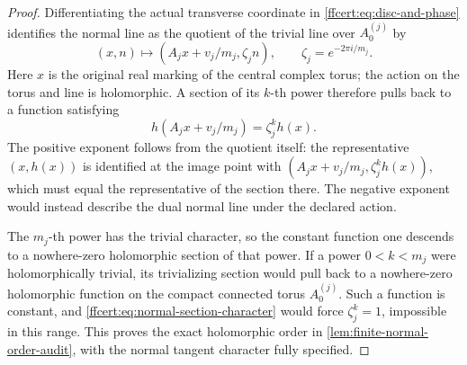 \begin{proof}
Differentiating the actual transverse coordinate in
\eqref{ffcert:eq:disc-and-phase} identifies the normal line as the
quotient of the trivial line over $A_0^{(j)}$ by
\[
 (x,n)\longmapsto(A_jx+v_j/m_j,\zeta_j n),
 \qquad \zeta_j=e^{-2\pi i/m_j}.
 \tag{FF42}\label{ffcert:eq:normal-action}
\]
Here $x$ is the original real marking of the central complex torus;
the action on the torus and line is holomorphic. A section of its
$k$-th power therefore pulls back to a function satisfying
\[
 h(A_jx+v_j/m_j)=\zeta_j^k h(x).
 \tag{FF43}\label{ffcert:eq:normal-section-character}
\]
The positive exponent follows from the quotient itself: the representative
$(x,h(x))$ is identified at the image point with
$(A_jx+v_j/m_j,\zeta_j^kh(x))$, which must equal the representative
of the section there. The negative exponent would instead describe
the dual normal line under the declared action.

The $m_j$-th power has the trivial character, so the constant function
one descends to a nowhere-zero holomorphic section of that power.
If a power $0<k<m_j$ were holomorphically trivial, its trivializing
section would pull back to a nowhere-zero holomorphic function on the
compact connected torus $A_0^{(j)}$. Such a function is constant,
and \eqref{ffcert:eq:normal-section-character} would force
$\zeta_j^k=1$, impossible in this range. This proves the exact
holomorphic order in \cref{lem:finite-normal-order-audit}, with the
normal tangent character fully specified.


\end{proof}

